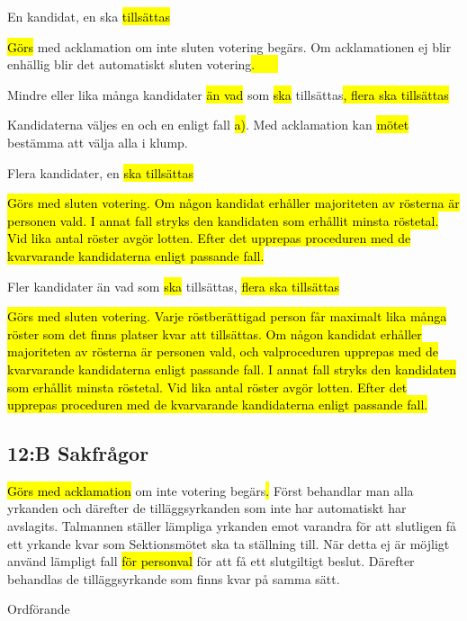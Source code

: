 \documentclass[../_main/handlingar.tex]{subfiles}
\begin{document}
\begin{attsatser}
        \begin{alphlist}
        \item En kandidat, en ska \hl{tillsättas}\par
        \hl{Görs} med acklamation om inte sluten votering begärs. Om acklamationen ej blir enhällig blir det automatiskt sluten votering\hl{. \ \ \ }

        \item Mindre eller lika många kandidater \hl{än vad} som \hl{ska} tillsättas\hl{, flera ska tillsättas}\par
        Kandidaterna väljes en och en enligt fall \hl{a)}. Med acklamation kan \hl{mötet} bestämma att välja alla i klump.

        \item Flera kandidater, en \hl{ska tillsättas}\par
        \hl{
        Görs med sluten votering.
        Om någon kandidat erhåller majoriteten av rösterna är personen vald.
        I annat fall stryks den kandidaten som erhållit minsta röstetal.
        Vid lika antal röster avgör lotten.
        Efter det upprepas proceduren med de kvarvarande kandidaterna enligt passande fall.
        }

        \item Fler kandidater än vad som \hl{ska} tillsättas, \hl{flera ska tillsättas}\par
        \hl{
        Görs med sluten votering.
        Varje röstberättigad person får maximalt lika många röster som det finns platser kvar att tillsättas.
        Om någon kandidat erhåller majoriteten av rösterna är personen vald, och valproceduren upprepas med de kvarvarande kandidaterna enligt passande fall.
        I annat fall stryks den kandidaten som erhållit minsta röstetal.
        Vid lika antal röster avgör lotten.
        Efter det upprepas proceduren med de kvarvarande kandidaterna enligt passande fall.
        }
        \end{alphlist}

        \subsection{12:B Sakfrågor}

        \hl{Görs med acklamation} om inte votering begärs\hl{. }Först behandlar man alla yrkanden och därefter de tilläggsyrkanden som inte har automatiskt har avslagits. Talmannen ställer lämpliga yrkanden emot varandra för att slutligen få ett yrkande kvar som Sektionsmötet ska ta ställning till. När detta ej är möjligt använd lämpligt fall \hl{för personval} för att få ett slutgiltigt beslut. Därefter behandlas de tilläggsyrkande som finns kvar på samma sätt.

    \changenote

\end{attsatser}

\begin{signatures}{1}
    \ist
    \signature{\ordf}{Ordförande}
\end{signatures}
\end{document}
